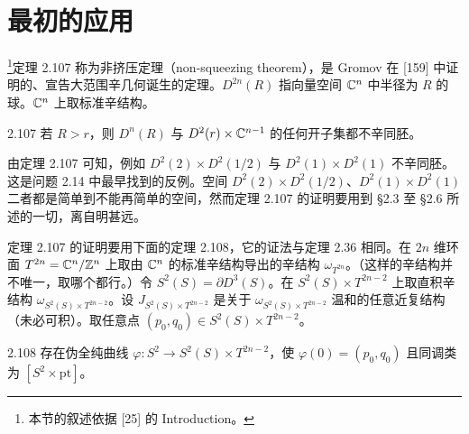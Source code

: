 \section{最初的应用}


\footnote{本节的叙述依据 [25] 的 Introduction。}定理 2.107 称为非挤压定理（non-squeezing theorem），是 Gromov 在 [159] 中证明的、宣告大范围辛几何诞生的定理。$D^{2n}(R)$ 指向量空间 $\mathbb{C}^n$ 中半径为 $R$ 的球。$\mathbb{C}^n$ 上取标准辛结构。

\begin{theorem}{2.107}
  若 $R>r$，则 $D^n(R)$ 与 $D^2(r)\times\mathbb{C}^{n-1}$ 的任何开子集都不辛同胚。
\end{theorem}


由定理 2.107 可知，例如 $D^2(2)\times D^2(1/2)$ 与 $D^2(1)\times D^2(1)$ 不辛同胚。这是问题 2.14 中最早找到的反例。空间 $D^2(2)\times D^2(1/2)$、$D^2(1)\times D^2(1)$ 二者都是简单到不能再简单的空间，然而定理 2.107 的证明要用到 §2.3 至 §2.6 所述的一切，离自明甚远。

定理 2.107 的证明要用下面的定理 2.108，它的证法与定理 2.36 相同。在 $2n$ 维环面 $T^{2n}=\mathbb{C}^n/\mathbb{Z}^n$ 上取由 $\mathbb{C}^n$ 的标准辛结构导出的辛结构 $\omega_{T^{2n}}$。（这样的辛结构并不唯一，取哪个都行。）令 $S^2(S)=\partial D^3(S)$。在 $S^2(S)\times T^{2n-2}$ 上取直积辛结构 $\omega_{S^2(S)\times T^{2n-2}}$。设 $J_{S^2(S)\times T^{2n-2}}$ 是关于 $\omega_{S^2(S)\times T^{2n-2}}$ 温和的任意近复结构（未必可积）。取任意点 $(p_0,q_0)\in S^2(S)\times T^{2n-2}$。

\begin{theorem*}{2.108}
  存在伪全纯曲线 $\varphi\colon S^2\to S^2(S)\times T^{2n-2}$，使 $\varphi(0)=(p_0,q_0)$ 且同调类为 $[S^2\times\mathrm{pt}]$。
\end{theorem*}

